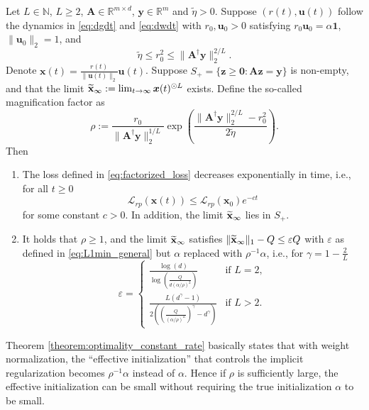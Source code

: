 \documentclass{svproc}
\newcommand{\corr}[1]{#1}
\newcommand{\bA}{\boldsymbol{A}}
\newcommand{\bu}{\boldsymbol{u}}
\newcommand{\bx}{\boldsymbol{x}}
\newcommand{\by}{\boldsymbol{y}}
\newcommand{\bz}{\boldsymbol{z}}
\newcommand{\0}{\boldsymbol{0}}
\newcommand{\1}{\boldsymbol{1}}
\renewcommand{\tilde}{\widetilde}
\renewcommand{\epsilon}{\varepsilon}
\def\xprod{\tilde{\bf x}}
\def\xprodinfty{\xprod_\infty}
\def\tcont{{t}}
\def\lrr{{\tilde{\eta}}}
\begin{document}
\begin{theorem}\label{theorem:optimality_constant_rate}
Let $L\in\mathbb{N}$, $L\geq 2$, $\bA\in\mathbb{R}^{m\times d}$, $\by\in\mathbb{R}^{m}$ and $\lrr>0$. Suppose $(r(\tcont),\bu(\tcont))$ follow the dynamics in \eqref{eq:dgdt} and \eqref{eq:dwdt} with $r_0,\bu_0>0$ satisfying $r_0\bu_0=\alpha\1$, $\|\bu_0\|_2 = 1$, and 
\[
\lrr\leq r_0^2\leq\|\bA^\dagger\by\|_{2}^{2/L}.
\]
Denote $\bx(\tcont)=\frac{r(\tcont)}{\|\bu(\tcont)\|_2}\bu(\tcont)$. Suppose $S_+ = \{\bz\geq \0:\bA\bz = \by\}$ is non-empty, and that the limit $\xprodinfty:= \lim_{\tcont\to\infty}\bx(\tcont)^{\odot L}$ exists. Define the so-called magnification factor as
\begin{equation}
\label{eq:rho}
    \rho:=\frac{r_0}{\|\bA^\dagger\by\|_{2}^{1/L}}\exp\left(\frac{\|\bA^\dagger\by\|_{2}^{2/L} - r_0^2}{2\lrr}\right).
\end{equation}
Then
\begin{enumerate}
    \item The loss defined in \eqref{eq:factorized_loss} decreases exponentially in time, i.e., for all $\tcont\geq 0$
    \begin{equation}\label{WN:conv:rate}
        \mathcal{L}_{rp}(\bx(\tcont)) \leq \mathcal{L}_{rp}(\bx_0)e^{-c\tcont}    
    \end{equation}
    for some constant $c>0$. In addition, the limit $\xprodinfty$ lies \corr{in} $S_+$.
    \item It holds that $\rho\geq 1$, and the limit $\xprodinfty$ satisfies $\|\xprodinfty\|_1-Q\leq\epsilon Q$ with $\epsilon$ as defined in \eqref{eq:L1min_general} but $\alpha$ replaced with $\rho^{-1}\alpha$, i.e., for $\gamma = 1 - \frac{2}{L}$
    \[
\epsilon=\begin{cases}
            \frac{\log(d)}{\log\left(\frac{Q}{d(\alpha/\rho)^2}\right)} &\text{if }L=2,\\[10pt]
            \frac{L(d^\gamma-1)}{ 2\left(\left(\frac{Q}{(\alpha/\rho)^L}\right)^\gamma-d^\gamma\right)}&\text{if }L>2.
            \end{cases}
    \]
    \end{enumerate}
\end{theorem}


Theorem \ref{theorem:optimality_constant_rate} basically states that with weight normalization, the ``effective initialization'' that controls the implicit regularization becomes $\rho^{-1}\alpha$ instead of $\alpha$. Hence if $\rho$ is sufficiently large, the effective initialization can be small without requiring the true initialization $\alpha$ to be small.
\end{document}

